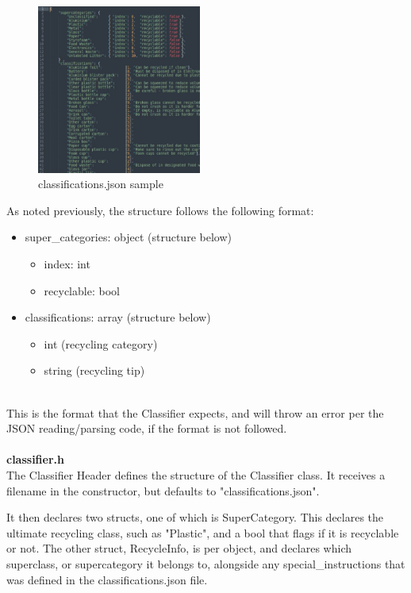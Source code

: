 \documentclass[conference]{IEEEtran}
\begin{document}
\begin{figure}[h]
    \centering
    \includegraphics[width=0.48\textwidth]{images/sourcecode/classifications_json.eps}
    \caption{classifications.json sample}
\end{figure}

As noted previously, the structure follows the following format:

\begin{itemize}
\item super\_categories: object (structure below)
\begin{itemize}
\item index: int
\item recyclable: bool
\end{itemize}
\item classifications: array (structure below)
\begin{itemize}
\item int (recycling category)
\item string (recycling tip)
\end{itemize}
\end{itemize}~\\

This is the format that the Classifier expects, and will throw an error per the JSON reading/parsing code, if the format is not followed.~\\~\\


\textbf{classifier.h}~\\

The Classifier Header defines the structure of the Classifier class. It receives a filename in the constructor, but defaults to "classifications.json".

It then declares two structs, one of which is SuperCategory. This declares the ultimate recycling class, such as "Plastic", and a bool that flags if it is recyclable or not. The other struct, RecycleInfo, is per object, and declares which superclass, or supercategory it belongs to, alongside any special\_instructions that was defined in the classifications.json file. 
\end{document}
